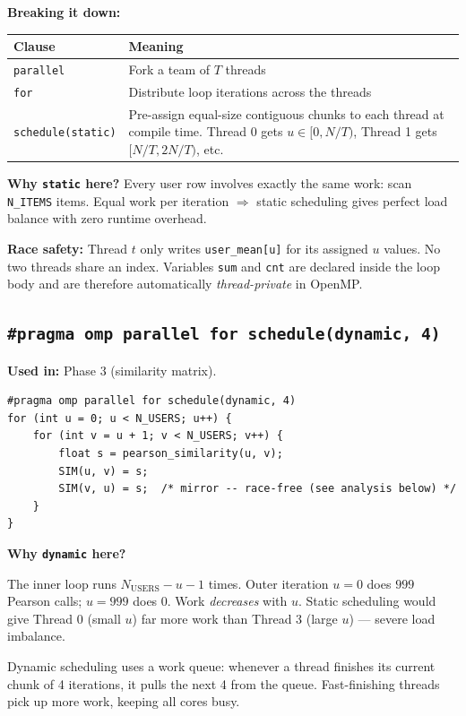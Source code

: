 \documentclass[12pt,a4paper]{article}
\begin{document}
\textbf{Breaking it down:}

\begin{center}
\begin{tabular}{lp{9cm}}
\toprule
Clause & Meaning \\
\midrule
\texttt{parallel} & Fork a team of $T$ threads \\
\texttt{for} & Distribute loop iterations across the threads \\
\texttt{schedule(static)} & Pre-assign equal-size contiguous chunks to each
  thread at compile time.  Thread 0 gets $u \in [0, N/T)$, Thread 1 gets
  $[N/T, 2N/T)$, etc. \\
\bottomrule
\end{tabular}
\end{center}

\textbf{Why \texttt{static} here?}  Every user row involves exactly the same
work: scan \texttt{N\_ITEMS} items.  Equal work per iteration $\Rightarrow$
static scheduling gives perfect load balance with zero runtime overhead.

\textbf{Race safety:}  Thread $t$ only writes \texttt{user\_mean[u]} for its
assigned $u$ values.  No two threads share an index.  Variables \texttt{sum}
and \texttt{cnt} are declared inside the loop body and are therefore
automatically \emph{thread-private} in OpenMP.

\subsection{\texttt{\#pragma omp parallel for schedule(dynamic, 4)}}

\textbf{Used in:} Phase 3 (similarity matrix).

\begin{lstlisting}
#pragma omp parallel for schedule(dynamic, 4)
for (int u = 0; u < N_USERS; u++) {
    for (int v = u + 1; v < N_USERS; v++) {
        float s = pearson_similarity(u, v);
        SIM(u, v) = s;
        SIM(v, u) = s;  /* mirror -- race-free (see analysis below) */
    }
}
\end{lstlisting}

\textbf{Why \texttt{dynamic} here?}

The inner loop runs $N_{\text{USERS}} - u - 1$ times.  Outer iteration $u=0$
does $999$ Pearson calls; $u=999$ does $0$.  Work \emph{decreases} with $u$.
Static scheduling would give Thread 0 (small $u$) far more work than Thread 3
(large $u$) — severe load imbalance.

Dynamic scheduling uses a work queue: whenever a thread finishes its current
chunk of 4 iterations, it pulls the next 4 from the queue.  Fast-finishing
threads pick up more work, keeping all cores busy.
\end{document}
